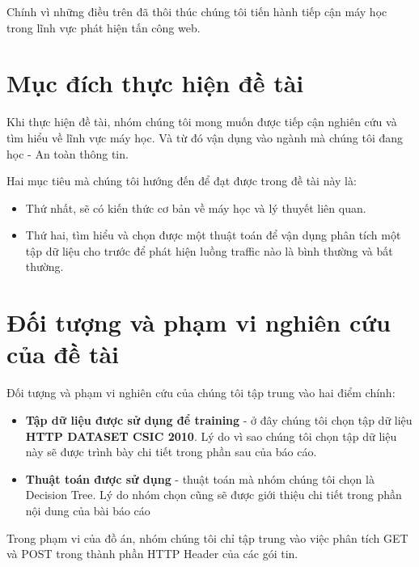 \documentclass[../main-report.tex]{subfiles}
\begin{document}
Chính vì những điều trên đã thôi thúc chúng tôi tiến hành tiếp cận máy học trong lĩnh vực phát hiện tấn công web.

\section*{Mục đích thực hiện đề tài}
Khi thực hiện đề tài, nhóm chúng tôi mong muốn được tiếp cận nghiên cứu và tìm hiểu về lĩnh vực máy học. Và từ đó vận dụng vào ngành mà chúng tôi đang học - An toàn thông tin.

Hai mục tiêu mà chúng tôi hướng đến để đạt được trong đề tài này là:

\begin{itemize}
\item Thứ nhất, sẽ có kiến thức cơ bản về máy học và lý thuyết liên quan.
\item Thứ hai, tìm hiểu và chọn được một thuật toán để vận dụng phân tích một tập dữ liệu cho trước để phát hiện luồng traffic nào là bình thường và bất thường.
\end{itemize}

\section*{Đối tượng và phạm vi nghiên cứu của đề tài}
Đối tượng và phạm vi nghiên cứu của chúng tôi tập trung vào hai điểm chính:

\begin{itemize}
\item \textbf{Tập dữ liệu được sử dụng để training} - ở đây chúng tôi chọn tập dữ liệu \textbf{HTTP DATASET CSIC 2010}. Lý do vì sao chúng tôi chọn tập dữ liệu này sẽ được trình bày chi tiết trong phần sau của báo cáo.
\item \textbf{Thuật toán được sử dụng} - thuật toán mà nhóm chúng tôi chọn là Decision Tree. Lý do nhóm chọn cũng sẽ được giới thiệu chi tiết trong phần nội dung của bài báo cáo
\end{itemize}

Trong phạm vi của đồ án, nhóm chúng tôi chỉ tập trung vào việc phân tích GET và POST trong thành phần HTTP Header của các gói tin.
\end{document}
